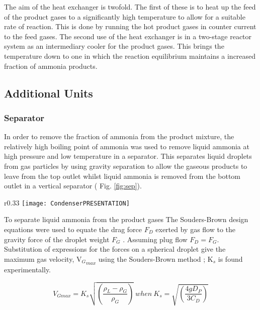 The aim of the heat exchanger is twofold. The first of these is to heat up the feed of the product gases to a significantly high temperature to allow for a suitable rate of reaction. This is done by running the hot product gases in counter current to the feed gases. The second use of the heat exchanger is in a two-stage reactor system as an intermediary cooler for the product gases. This brings the temperature down to one in which the reaction equilibrium maintains a increased fraction of ammonia products.

\subsection{Additional Units}

\subsubsection{Separator}

In order to remove the fraction of ammonia from the product mixture, the relatively high boiling point of ammonia was used to remove liquid ammonia at high pressure and low temperature in a separator. This separates liquid droplets from gas particles by using gravity separation to allow the gaseous products to leave from the top outlet whilst liquid ammonia is removed from the bottom outlet in a vertical separator ( Fig. \ref{fig:sep}).

\begin{wrapfigure}{r}{0.33\textwidth}
	\centering
	\texttt{[image: CondenserPRESENTATION]}
	\caption{Vertical separator \label{fig:sep}}
\end{wrapfigure}

To separate liquid ammonia from the product gases The Souders-Brown design equations were used to equate the drag force $F_D$ exerted by gas flow to the gravity force of the droplet weight $F_G$ \cite{Campbell2015} \cite{Jekel2001}. Assuming plug flow $F_D = F_G$. Substitution of expressions for the forces on a spherical droplet give the maximum gas velocity, V${_G}_{max}$ using the Souders-Brown method \cite{Souders1934}; K$_s$ is found experimentally.

\begin{equation} V_{Gmax}=K_s\sqrt{ \left ( \frac{\rho_L - \rho_G}{\rho_G} \right )}\  when \  K_s = \sqrt{ \left ( \frac{4gD_P}{3C_D} \right )} \end{equation}

